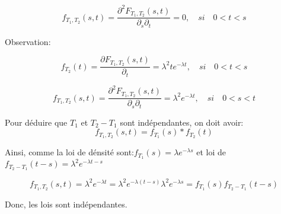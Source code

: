 \documentclass[a4paper]{article}
\begin{document}
 \begin{equation*}
 f_{T_1,T_2}(s,t)                                                               =
 \frac{  \partial^2F_{T_1,T_2}(s,t)}{\partial_{s}\partial_{t}}=0,  \quad si  \quad
 0<t<s
 \end{equation*}

Observation:

 \begin{equation*}
 f_{T_2}(t)                                                               =
 \frac{ \partial F_{T_1,T_2}(s,t)}{\partial_{t}}=\lambda^2te^{-\lambda t}, \quad si \quad
 0<t<s
 \end{equation*}



 \begin{equation*}
 f_{T_1,T_2}(s,t)                                                               =
 \frac{ \partial^2F_{T_1,T_2}(s,t)}{\partial_{s}\partial_{t}}=\lambda^2e^{-\lambda t}, \quad si \quad
 0<s<t
 \end{equation*}


Pour déduire que $T_1$ et $T_2-T_1$ sont indépendantes, on doit avoir:
 \begin{equation*}
 f_{T_1,T_2}(s,t)=f_{T_1}(s)*f_{T_2}(t)
 \end{equation*}

Ainsi, comme la loi de dénsité sont:$f_{T_1}(s)=\lambda e^{-\lambda s}$ et loi de $f_{T_2-T_1}(t-s)=\lambda^{2}e^{-\lambda t-s}$

\begin{equation}
 f_{T_1,T_2}(s,t)=\lambda^2e^{-\lambda t}=\lambda^2e^{-\lambda (t-s)}\lambda^2e^{-\lambda s}=f_{T_1}(s)f_{T_2-T_1}(t-s)
\end{equation}

Donc, les lois sont indépendantes.


\end{document}
